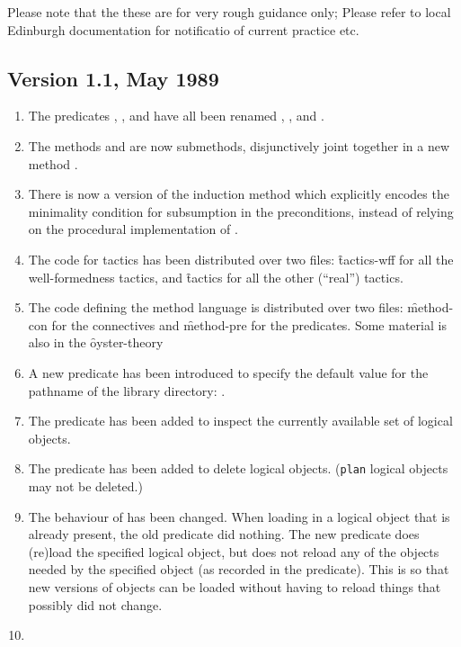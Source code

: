 Please note that the these are for very rough guidance only; Please
refer to local Edinburgh documentation for notificatio of current
practice etc.

\subsection {Version 1.1, May 1989}

\begin{enumerate}
\item
The predicates , ,  and
 have all been renamed , ,
 and  .
\item
The methods  and  are now
submethods, disjunctively joint together in a new method
.
\item
There is now a version of the induction method which explicitly
encodes the minimality condition for subsumption in the preconditions,
instead of relying on the procedural implementation of .
\item
The code for tactics has been distributed over two files:
\f{tactics-wff} for all the well-formedness tactics, and \f{tactics}
for all the other (``real'') tactics.
\item
The code defining the method language is distributed over two
files: \f{method-con} for the connectives and \f{method-pre} for the
predicates.  Some material is also in the \f{oyster-theory}
\item
A new predicate has been introduced to specify the default value for
the pathname of the library directory: .
\item
The predicate  has been added to inspect the
currently available set of logical objects.
\item
The predicate  has been added to delete logical
objects.  ({\tt plan} logical objects may not be deleted.)
\item
The behaviour of  has been changed. When loading in
a logical object that is already present, the old predicate did
nothing. The new predicate does (re)load the specified logical object,
but does not reload any of the objects needed by the specified object
(as recorded in the  predicate). This is so that new
versions of objects can be loaded without having to reload things that
possibly did not change. 
\item

\end{enumerate}

